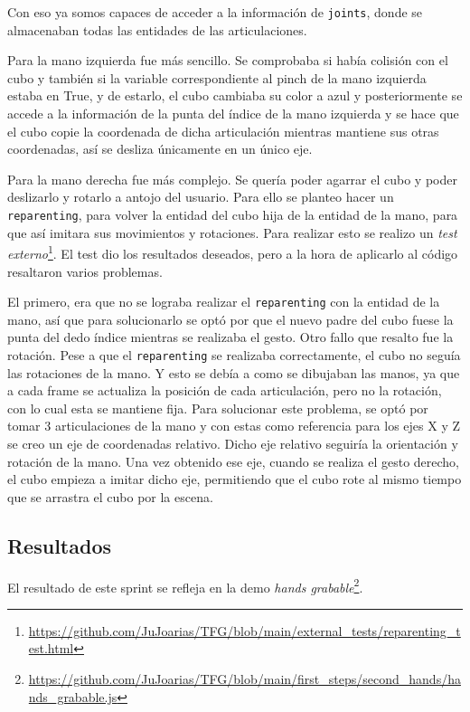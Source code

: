 \documentclass[a4paper, 12pt]{book}
\begin{document}
Con eso ya somos capaces de acceder a la información de \texttt{joints}, donde se almacenaban todas las entidades de las articulaciones.

Para la mano izquierda fue más sencillo. Se comprobaba si había colisión con el cubo y también si la variable correspondiente al pinch de la mano izquierda estaba en True, y de estarlo, el cubo cambiaba su color a azul y posteriormente se accede a la información 
de la punta del índice de la mano izquierda y se hace que el cubo copie la coordenada de dicha articulación mientras mantiene sus otras coordenadas, así se desliza únicamente en un único eje.

Para la mano derecha fue más complejo. Se quería poder agarrar el cubo y poder deslizarlo y rotarlo a antojo del usuario. Para ello se planteo hacer un \texttt{reparenting}, para volver la entidad del cubo hija de la entidad de la mano, para que así imitara sus movimientos y rotaciones. Para realizar esto se realizo un \textit{test externo}\footnote{\url{https://github.com/JuJoarias/TFG/blob/main/external_tests/reparenting_test.html}}.
El test dio los resultados deseados, pero a la hora de aplicarlo al código resaltaron varios problemas. 

El primero, era que no se lograba realizar el \texttt{reparenting} con la entidad de la mano, así que para solucionarlo se optó por que el nuevo padre del cubo fuese la punta del dedo índice mientras se realizaba el gesto.
Otro fallo que resalto fue la rotación. Pese a que el \texttt{reparenting} se realizaba correctamente, el cubo no seguía las rotaciones de la mano. Y esto se debía a como se dibujaban las manos, ya que a cada frame se actualiza la posición de cada articulación, pero no la rotación, con lo cual esta se mantiene fija. Para solucionar este problema, se optó por tomar 3 articulaciones de la mano y con estas 
como referencia para los ejes X y Z se creo un eje de coordenadas relativo. Dicho eje relativo seguiría la orientación y rotación de la mano. Una vez obtenido ese eje, cuando se realiza el gesto derecho, el cubo empieza a imitar dicho eje, permitiendo que el cubo rote al mismo tiempo que se arrastra el cubo por la escena. 
\subsection{Resultados}
\label{subsec:resultados5}
El resultado de este sprint se refleja en la demo \textit{hands grabable}\footnote{\url{https://github.com/JuJoarias/TFG/blob/main/first_steps/second_hands/hands_grabable.js}}. 
\end{document}
